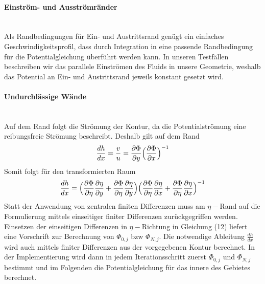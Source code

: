 \documentclass{article}
\newcommand{\dpP}{\partial \Phi}
\newcommand{\dpEta}{\partial \eta}
\newcommand{\dpX}{\partial x}
\newcommand{\dpY}{\partial y}
\begin{document}
\paragraph{Einström- und Ausströmränder}
$~~$\\
Als Randbedingungen für Ein- und Austrittsrand genügt ein einfaches Geschwindigkeitsprofil, dass durch Integration
in eine passende Randbedingung für die Potentialgleichung überführt werden kann.
In unseren Testfällen beschreiben wir das parallele Einströmen des Fluids in unsere Geometrie,
weshalb das Potential an Ein- und Austrittsrand jeweils konstant gesetzt wird.
\paragraph{Undurchlässige Wände}
$~~$\\
Auf dem Rand folgt die Strömung der Kontur, da die Potentialströmung eine reibungsfreie Strömung beschreibt.
Deshalb gilt auf dem Rand 
\begin{align}
\frac{dh}{dx} = \frac{v}{u} = \frac{\partial \Phi}{\partial y}\Bigl(\frac{\partial \Phi}{\partial x}\Bigr)^{-1}
\end{align}
Somit folgt für den transformierten Raum
\begin{align}
\frac{dh}{dx} = \Bigl(\frac{\dpP}{\dpEta}\frac{\dpEta}{\dpY}+ \frac{\dpP}{\dpEta}\frac{\dpEta}{\dpY}\Bigr)
\Bigl(\frac{\dpP}{\dpEta}\frac{\dpEta}{\dpX}+ \frac{\dpP}{\dpEta}\frac{\dpEta}{\dpX}\Bigr)^{-1}
\end{align}
Statt der Anwendung von zentralen finiten Differenzen muss am $\eta-$Rand auf die Formulierung mittels einseitiger finiter Differenzen
zurückgegriffen werden. Einsetzen der einseitigen Differenzen in $\eta-$Richtung in Gleichung (12) liefert eine Vorschrift zur Berechnung von
$\Phi_{0,j}$ bzw $\Phi_{N,j}$.
Die notwendige Ableitung $\frac{dh}{dx}$ wird auch mittels finiter Differenzen aus der vorgegebenen Kontur berechnet.
In der Implementierung wird dann in jedem Iterationsschritt zuerst $\Phi_{0,j}$ und $\Phi_{N,j}$ bestimmt und im Folgenden
die Potentialgleichung für das innere des Gebietes berechnet. 
\end{document}
